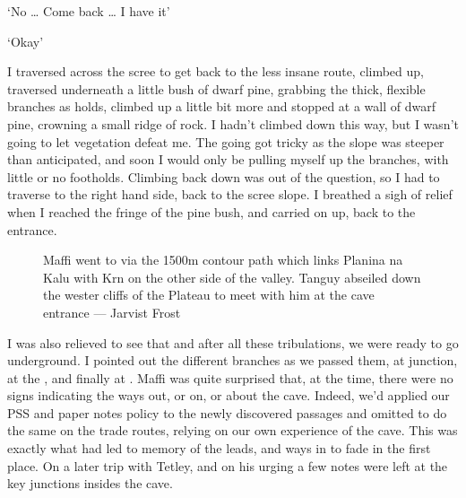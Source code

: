 `No … Come back … I have it'

`Okay'

I traversed across the scree to get back to the less insane route, climbed up, traversed underneath a little bush of dwarf pine, grabbing the thick, flexible branches as holds, climbed up a little bit more and stopped at a wall of dwarf pine, crowning a small ridge of rock. I hadn't climbed down this way, but I wasn't going to let vegetation defeat me. The going got tricky as the slope was steeper than anticipated, and soon I would only be pulling myself up the branches, with little or no footholds. Climbing back down was out of the question, so I had to traverse to the right  hand side, back to the scree slope. I breathed a sigh of relief when I reached the fringe of the pine bush, and carried on up, back to the entrance. 

\begin{figure}[t!]
\checkoddpage \ifoddpage \forcerectofloat \else \forceversofloat \fi
\centering
{}
\caption{Maffi went to  via the 1500m contour path which links Planina na Kalu with Krn on the other side of the valley. Tanguy abseiled down the wester cliffs of the Plateau to meet with him at the cave entrance --- Jarvist Frost}
\label{forest}
\end{figure}

I was also relieved to see that  and after all these tribulations, we were ready to go underground. I pointed out the different branches as we passed them, at  junction, at the , and finally at . Maffi was quite surprised that, at the time, there were no signs indicating the ways out, or on, or about the cave. Indeed, we'd applied our PSS and paper notes policy to the newly discovered passages and omitted to do the same on the trade routes, relying on our own experience of the cave. This was exactly what had led to memory of the leads, and ways in  to fade in the first place. On a later trip with Tetley, and on his urging a few notes were left at the key junctions insides the cave.

